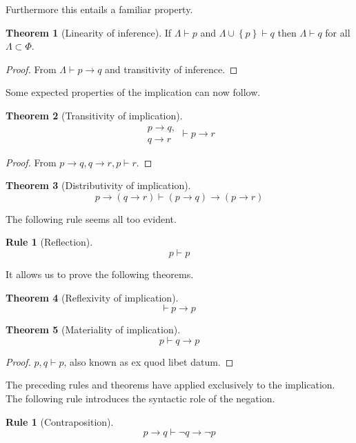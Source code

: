 \documentclass{amsbook}
\newcommand{\setsm}[1]{\left\{#1\right\}}
\newcommand{\infers}{\mathrel\vdash}
\newcommand{\theorem}{\mathord\vdash\medspace}
\newcommand{\then}{\mathrel\rightarrow}
\theoremstyle{definition}
\newtheorem{frule}{Rule}[chapter]
\newtheorem{subrule}{Rule}[subsection]
\newtheorem{thm}{Theorem}[section]
\begin{document}
Furthermore this entails a familiar property.

\begin{thm}[Linearity of inference]
    If $\varLambda \infers p$ and $\varLambda \cup \setsm p \infers q$ then $\varLambda \infers q$ for all $\varLambda \subset \Phi$.
    \begin{proof}
        From $\varLambda \infers p \then q$ and transitivity of inference.
    \end{proof}
\end{thm}

Some expected properties of the implication can now follow.

\begin{thm}[Transitivity of implication]
    $$\begin{aligned}
            p \then q, \\
            q \then r
        \end{aligned} \infers p \then r$$
    \begin{proof}
        From $p \then q, q \then r, p \infers r$.
    \end{proof}
\end{thm}

\begin{thm}[Distributivity of implication]
    $$p \then (q \then r) \infers (p \then q) \then (p \then r)$$
\end{thm}

The following rule seems all too evident.

\begin{subrule}[Reflection]
    $$p \infers p$$
\end{subrule}

It allows us to prove the following theorems.

\begin{thm}[Reflexivity of implication]
    $$\theorem p \then p$$
\end{thm}

\begin{thm}[Materiality of implication]
    $$p \infers q \then p$$
    \begin{proof}
        $p, q \infers p$, also known as ex quod libet datum.
    \end{proof}
\end{thm}

The preceding rules and theorems have applied exclusively to the implication. The following rule introduces the syntactic role of the negation.

\begin{frule}[Contraposition]
    $$p \then q \infers \neg q \then \neg p$$
\end{frule}
\end{document}
